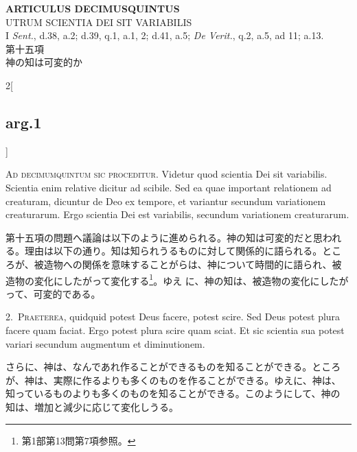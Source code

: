 \documentclass[paper=a4paper,fontsize=10pt,jafontsize=9pt,titlepage]{jlreq}
\begin{document}
\newpage



{}
\setcounter{section}{15}
\setcounter{subsection}{0}
\begin{center}
{\Large {\bfseries ARTICULUS DECIMUSQUINTUS}}\\ {\large UTRUM SCIENTIA DEI
SIT VARIABILIS}\\ {\footnotesize I {\itshape Sent.}, d.38, a.2;
d.39, q.1, a.1, 2; d.41, a.5; {\itshape De Verit.}, q.2, a.5,
ad 11; a.13.}\\ {\Large 第十五項\\神の知は可変的か}
\end{center}



\begin{paracol}{2}[\subsection{arg.1}]

{\huge A}{\scshape d decimumquintum sic proceditur}. Videtur quod
scientia Dei sit variabilis. Scientia enim relative dicitur ad
scibile. Sed ea quae important relationem ad creaturam, dicuntur de
Deo ex tempore, et variantur secundum variationem creaturarum. Ergo
scientia Dei est variabilis, secundum variationem creaturarum.

\switchcolumn

第十五項の問題へ議論は以下のように進められる。神の知は可変的だと思われ
る。理由は以下の通り。知は知られうるものに対して関係的に語られる。とこ
ろが、被造物への関係を意味することがらは、神について時間的に語られ、被
造物の変化にしたがって変化する\footnote{第1部第13問第7項参照。}。ゆえ
に、神の知は、被造物の変化にしたがって、可変的である。

\switchcolumn*

{\scshape 2.~Praeterea}, quidquid potest Deus facere, potest
scire. Sed Deus potest plura facere quam faciat. Ergo potest plura
scire quam sciat. Et sic scientia sua potest variari secundum
augmentum et diminutionem.

\switchcolumn

さらに、神は、なんであれ作ることができるものを知ることができる。ところ
が、神は、実際に作るよりも多くのものを作ることができる。ゆえに、神は、
知っているものよりも多くのものを知ることができる。このようにして、神の
知は、増加と減少に応じて変化しうる。

\switchcolumn*


\end{paracol}
\end{document}
